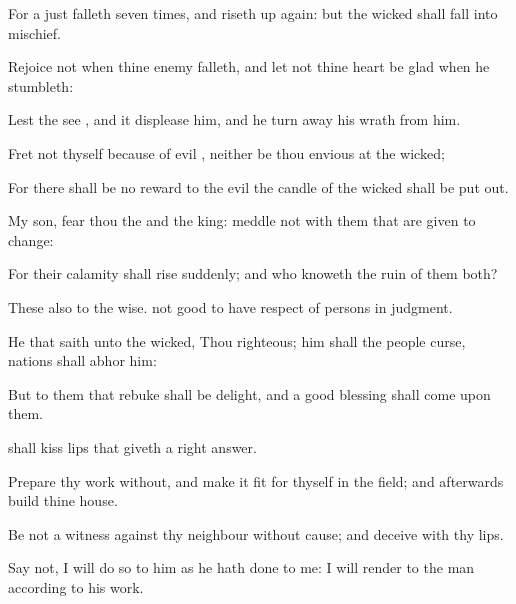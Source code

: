 {For a
just
{}
falleth seven
times, and riseth up
again: but the
wicked shall
fall into
mischief.


\par }{\PP {}Rejoice not when thine
enemy
falleth, and let not thine
heart be
glad when he
stumbleth:

Lest the
{}
see
{}, and it
displease him, and he turn
away his
wrath from him.


\par }{\PP {}Fret not thyself because of
evil
{}, neither be thou
envious at the
wicked;

For there shall be no
reward to the
evil
{} the
candle of the
wicked shall be put
out.


\par }{\PP {}My
son,
fear thou the
{} and the
king:
{}
meddle not with them that are given to
change:

For their
calamity shall
rise
suddenly; and who
knoweth the
ruin of them
both?


\par }{\PP {}These
{} also
{} to the
wise.
{} not
good to have
respect of
persons in
judgment.

He that
saith unto the
wicked, Thou
{}
righteous; him shall the
people
curse,
nations shall
abhor him:

But to them that
rebuke
{} shall be
delight, and a
good
blessing shall
come upon them.

 shall
kiss
{}
lips that
giveth a
right
answer.

Prepare thy
work
without, and make it
fit for thyself in the
field; and
afterwards
build thine
house.


\par }{\PP {}Be not a
witness against thy
neighbour without
cause; and
deceive
{} with thy
lips.

Say not, I will
do so to him as he hath
done to me: I will
render to the
man according to his
work.


}
